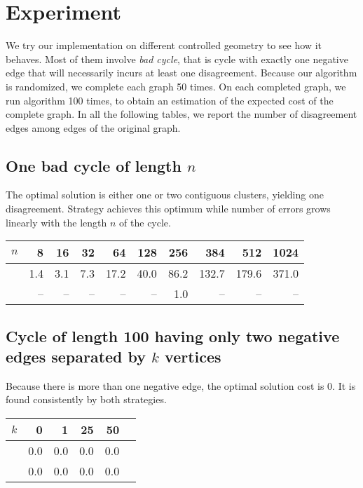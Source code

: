 \section{Experiment}

We try our implementation on different controlled geometry to see how it
behaves. Most of them involve \emph{bad cycle}, that is cycle with exactly one
negative edge that will necessarily incurs at least one disagreement.  Because
our algorithm is randomized, we complete each graph 50 times.  On each
completed graph, we run \ccp{} algorithm 100 times, to obtain an estimation of
the expected cost of the complete graph. In all the following tables, we
report the number of disagreement edges among edges of the original graph.

\subsection{One bad cycle of length $n$}

The optimal solution is either one or two contiguous clusters, yielding one
disagreement. Strategy \pat{} achieves this optimum while \pot{} number of
errors grows linearly with the length $n$ of the cycle.

\begin{center}
\begin{tabular}{lrrrrrrrrr}
\toprule
$n$      & 8   & 16  & 32  & 64   & 128  & 256  & 384   & 512   & 1024 \\
\midrule
\pot{}    & 1.4 & 3.1 & 7.3 & 17.2 & 40.0 & 86.2 & 132.7 & 179.6 & 371.0 \\
\pat{}    & --  & --  & --  & --   & --   & 1.0  & --    & --    & -- \\
\bottomrule
\end{tabular}
\end{center}

\subsection{Cycle of length 100 having only two negative edges separated by
	$k$ vertices}
Because there is more than one negative edge, the optimal solution cost is 0.
It is found consistently by both strategies.

\begin{center}
\begin{tabular}{lrrrrr}
\toprule
$k$ &   0  &   1  &   25 &   50  \\
\midrule
\pot{} & 0.0 & 0.0 & 0.0 & 0.0  \\
\pat{} &  0.0 &  0.0 & 0.0 & 0.0  \\
\bottomrule
\end{tabular}
\end{center}

